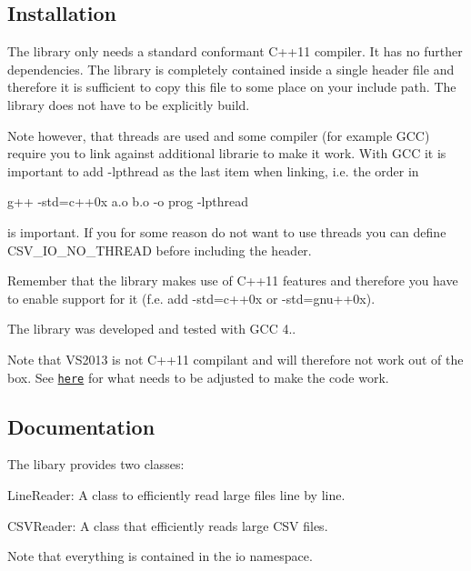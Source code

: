 \subsection*{Installation}

The library only needs a standard conformant C++11 compiler. It has no further dependencies. The library is completely contained inside a single header file and therefore it is sufficient to copy this file to some place on your include path. The library does not have to be explicitly build.

Note however, that threads are used and some compiler (for example G\+CC) require you to link against additional librarie to make it work. With G\+CC it is important to add -\/lpthread as the last item when linking, i.\+e. the order in


\begin{DoxyCode}
g++ -std=c++0x a.o b.o -o prog -lpthread
\end{DoxyCode}


is important. If you for some reason do not want to use threads you can define C\+S\+V\+\_\+\+I\+O\+\_\+\+N\+O\+\_\+\+T\+H\+R\+E\+AD before including the header.

Remember that the library makes use of C++11 features and therefore you have to enable support for it (f.\+e. add -\/std=c++0x or -\/std=gnu++0x).

The library was developed and tested with G\+CC 4..

Note that V\+S2013 is not C++11 compilant and will therefore not work out of the box. See \href{https://code.google.com/p/fast-cpp-csv-parser/issues/detail?id=6}{\tt here} for what needs to be adjusted to make the code work.

\subsection*{Documentation}

The libary provides two classes\+:


\begin{DoxyItemize}
\item {\ttfamily Line\+Reader}\+: A class to efficiently read large files line by line.
\item {\ttfamily C\+S\+V\+Reader}\+: A class that efficiently reads large C\+SV files.
\end{DoxyItemize}

Note that everything is contained in the {\ttfamily io} namespace.

